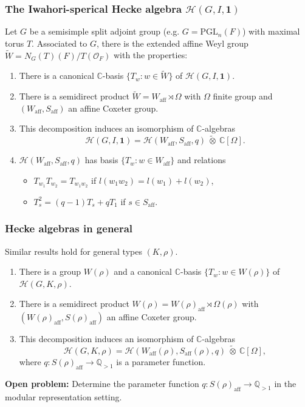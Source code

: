\documentclass{beamer}
\newcommand{\PGL}{\mathrm{PGL}}
\newcommand{\aff}{\mathrm{aff}}
\newcommand{\CC}{\mathbb{C}}
\newcommand{\QQ}{\mathbb{Q}}
\newcommand{\cH}{\mathcal{H}}
\theoremstyle{plain}
\begin{document}
\begin{frame}
    \frametitle{The Iwahori-sperical Hecke algebra $\cH(G,I,\mathbf{1})$}
    Let $G$ be a semisimple split adjoint group (e.g. $G=\PGL_n(F)$) with maximal torus $T$. \pause
    Associated to $G$, there is the extended affine Weyl group $\widetilde{W}=N_G(T)(F)/T(\mathcal{O}_F)$ with the properties:\pause
    \begin{enumerate}
        \item There is a canonical $\CC$-basis $\{T_w:w\in\widetilde{W}\}$ of $\cH(G,I,\mathbf{1})$.\pause
        \item There is a semidirect product $\widetilde{W}=W_{\aff}\rtimes\Omega$ with $\Omega$ finite group and $(W_{\aff},S_{\aff})$ an affine Coxeter group. \pause
        \item This decomposition induces an isomorphism of $\CC$-algebras
        \[\cH(G,I,\mathbf{1})=\cH(W_{\aff},S_{\aff},q)\ \tilde{\otimes}\ \CC[\Omega].\] \pause
        \item $\cH(W_{\aff},S_{\aff},q)$ has basis $\{T_w:w\in W_{\aff}\}$ and relations
        \begin{itemize}
            \item $T_{w_1}T_{w_2}=T_{w_1w_2}$ if $l(w_1w_2)=l(w_1)+l(w_2)$,
            \item $T_s^2=(q-1)T_s+qT_1$ if $s\in S_{\aff}$.
        \end{itemize}
    \end{enumerate}
\end{frame}

\begin{frame}
    \frametitle{Hecke algebras in general}
    Similar results hold for general types $(K,\rho)$. \pause
    \begin{enumerate}
        \item There is a group $W(\rho)$ and a canonical $\CC$-basis $\{T_w:w\in W(\rho)\}$ of $\cH(G,K,\rho)$. \pause
        \item There is a semidirect product $W(\rho)=W(\rho)_{\aff}\rtimes\Omega(\rho)$ with $(W(\rho)_{\aff},S(\rho)_{\aff})$ an affine Coxeter group. \pause
        \item This decomposition induces an isomorphism of $\CC$-algebras
        \[\cH(G,K,\rho)=\cH(W_{\aff}(\rho),S_{\aff}(\rho),q)\ \tilde{\otimes}\ \CC[\Omega],\]
        where $q:S(\rho)_{\aff}\rightarrow\QQ_{>1}$ is a parameter function.
    \end{enumerate}
    \vspace{0.3cm}\pause
    \textbf{Open problem:} Determine the parameter function $q:S(\rho)_{\aff}\rightarrow\QQ_{>1}$ in the modular representation setting. 
\end{frame}
\end{document}
